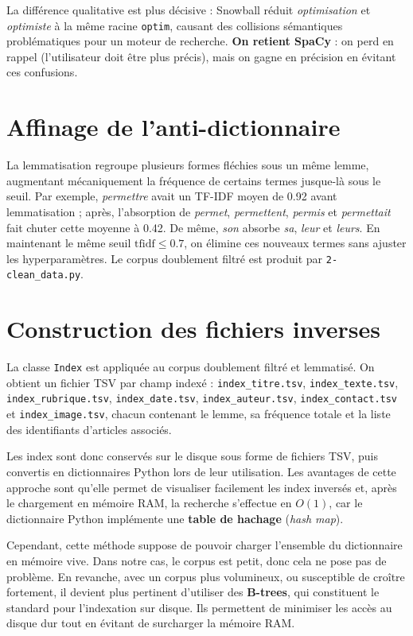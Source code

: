La différence qualitative est plus décisive : Snowball réduit \textit{optimisation} et \textit{optimiste} à la même racine \texttt{optim}, causant des collisions sémantiques problématiques pour un moteur de recherche. \textbf{On retient SpaCy} : on perd en rappel (l'utilisateur doit être plus précis), mais on gagne en précision en évitant ces confusions.

\section{Affinage de l'anti-dictionnaire}

La lemmatisation regroupe plusieurs formes fléchies sous un même lemme, augmentant mécaniquement la fréquence de certains termes jusque-là sous le seuil. Par exemple, \textit{permettre} avait un TF-IDF moyen de 0.92 avant lemmatisation ; après, l'absorption de \textit{permet}, \textit{permettent}, \textit{permis} et \textit{permettait} fait chuter cette moyenne à 0.42. De même, \textit{son} absorbe \textit{sa}, \textit{leur} et \textit{leurs}. En maintenant le même seuil $\text{tfidf} \leq 0.7$, on élimine ces nouveaux termes sans ajuster les hyperparamètres. Le corpus doublement filtré est produit par \texttt{2-clean\_data.py}.

\section{Construction des fichiers inverses}\label{section:fichierinv}

La classe \texttt{Index} est appliquée au corpus doublement filtré et lemmatisé. On obtient un fichier TSV par champ indexé : \texttt{index\_titre.tsv}, \texttt{index\_texte.tsv}, \texttt{index\_rubrique.tsv}, \texttt{index\_date.tsv}, \texttt{index\_auteur.tsv}, \texttt{index\_contact.tsv} et \texttt{index\_image.tsv}, chacun contenant le lemme, sa fréquence totale et la liste des identifiants d'articles associés.

Les index sont donc conservés sur le disque sous forme de fichiers TSV, puis convertis en dictionnaires Python lors de leur utilisation. Les avantages de cette approche sont qu'elle permet de visualiser facilement les index inversés et, après le chargement en mémoire RAM, la recherche s'effectue en $O(1)$, car le dictionnaire Python implémente une \textbf{table de hachage} (\textit{hash map}). 

Cependant, cette méthode suppose de pouvoir charger l'ensemble du dictionnaire en mémoire vive. Dans notre cas, le corpus est petit, donc cela ne pose pas de problème. En revanche, avec un corpus plus volumineux, ou susceptible de croître fortement, il devient plus pertinent d'utiliser des \textbf{B-trees}, qui constituent le standard pour l'indexation sur disque. Ils permettent de minimiser les accès au disque dur tout en évitant de surcharger la mémoire RAM.

